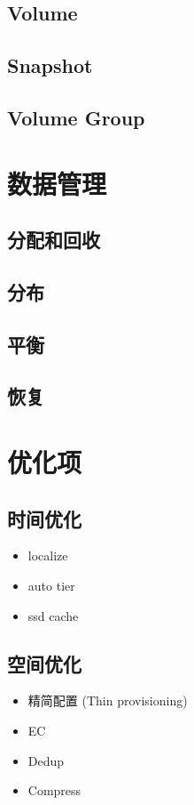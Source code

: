 \documentclass[UTF8]{ctexart}
\begin{document}
\subsection{Volume}
\subsection{Snapshot}
\subsection{Volume Group}

\section{数据管理}

\subsection{分配和回收}
\subsection{分布}
\subsection{平衡}
\subsection{恢复}

\section{优化项}

\subsection{时间优化}

\begin{itemize}
    \item localize
    \item auto tier
    \item ssd cache
\end{itemize}

\subsection{空间优化}

\begin{itemize}
    \item 精简配置 (Thin provisioning)
    \item EC
    \item Dedup
    \item Compress
\end{itemize}
\end{document}

